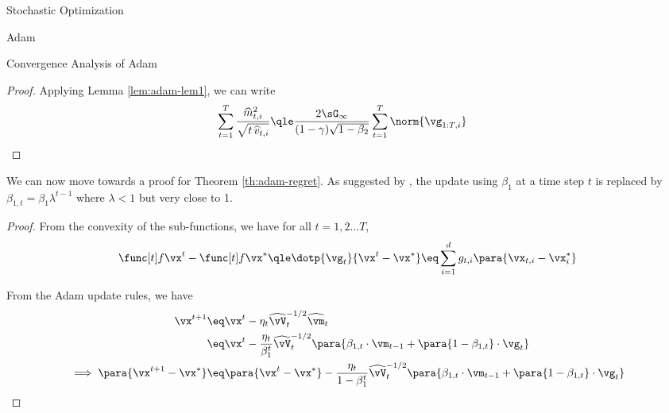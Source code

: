 \documentclass{article}
\begin{document}
\begin{psection}{Stochastic Optimization}
\begin{psubsection}{Adam}
\begin{pssubsection}{Convergence Analysis of Adam}
\begin{lemma}
\begin{proof}
					Applying Lemma \ref{lem:adam-lem1}, we can write
					\begin{align*}
						\sum_{t = 1}^T \frac{\widehat{m}_{t, i}^2}{\displaystyle \sqrt{t \, \widehat{v}_{t, i}}} &\qle \frac{2 \sG_{\infty}}{(1 - \gamma) \sqrt{1 - \beta_2}} \sum_{t = 1}^T \norm{\vg_{1:T, i}}
					\end{align*}
				\end{proof}
				\label{lem:adam-lem2}
			\end{lemma}

			We can now move towards a proof for Theorem \ref{th:adam-regret}. As suggested by \cite{adam}, the update using $\beta_1$ at a time step $t$ is replaced by $\beta_{1, t} = \beta_{1} \lambda^{t - 1}$ where $\lambda < 1$ but very close to 1.

			\begin{proof}
				From the convexity of the sub-functions, we have for all $t = 1, 2 \dots T$,
				\begin{align*}
					\f[t]{t} - \fs[t] \qle \dotp{\vg_t}{\x{t} - \xs} \eq \sum_{i = 1}^d g_{t, i} \para{\vx_{t, i} - \xs_i}
				\end{align*}

				From the Adam update rules, we have
				\begin{align*}
					\x{t+1} &\eq \x{t} - \eta_t \widehat{\vV}_t^{-1/2} \widehat{\vm}_t \\
					&\eq \x{t} - \frac{\eta_t}{\beta_1^t} \widehat{\vV}_t^{-1/2} \para{\beta_{1, t} \cdot \vm_{t - 1} + \para{1 - \beta_{1, t}} \cdot \vg_t} \\
					\implies \para{\x{t + 1} - \xs} &\eq \para{\x{t} - \xs} - \frac{\eta_t}{1 - \beta_1^t} \widehat{\vV}_t^{-1/2} \para{\beta_{1, t} \cdot \vm_{t - 1} + \para{1 - \beta_{1, t}} \cdot \vg_t}
				\end{align*}


\end{proof}
\end{pssubsection}
\end{psubsection}
\end{psection}
\end{document}
